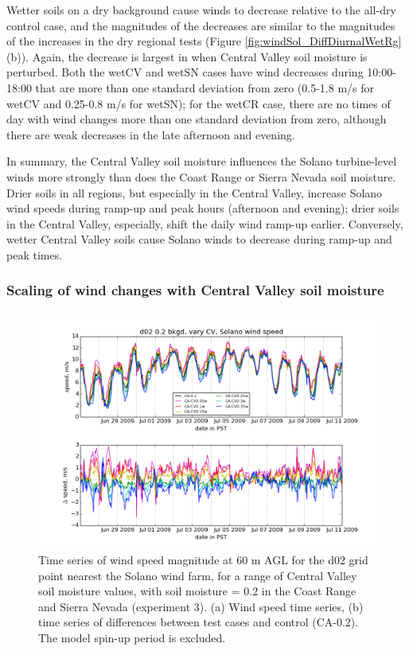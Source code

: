 Wetter soils on a dry background cause winds to decrease relative to the all-dry control case, and the magnitudes of the decreases are similar to the magnitudes of the increases in the dry regional tests (Figure \ref{fig:windSol_DiffDiurnalWetRg}(b)).  Again, the decrease is largest in when Central Valley soil moisture is perturbed.  Both the wetCV and wetSN cases have wind decreases during 10:00-18:00 that are more than one standard deviation from zero (0.5-1.8 m/s for wetCV and 0.25-0.8 m/s for wetSN); for the wetCR case, there are no times of day with wind changes more than one standard deviation from zero, although there are weak decreases in the late afternoon and evening.

In summary, the Central Valley soil moisture influences the Solano turbine-level winds more strongly than does the Coast Range or Sierra Nevada soil moisture.  Drier soils in all regions, but especially in the Central Valley, increase Solano wind speeds during ramp-up and peak hours (afternoon and evening); drier soils in the Central Valley, especially, shift the daily wind ramp-up earlier.  Conversely, wetter Central Valley soils cause Solano winds to decrease during ramp-up and peak times.

\subsubsection{Scaling of wind changes with Central Valley soil moisture}

\begin{figure}[here]
\includegraphics[width=1\textwidth]{ch3-wind/img/solano_wind_CV0pt2_d02_level0.png}
\caption{Time series of wind speed magnitude at 60 m AGL for the d02 grid point nearest the Solano wind farm, for a range of Central Valley soil moisture values, with soil moisture = 0.2 in the Coast Range and Sierra Nevada (experiment 3).  (a) Wind speed time series, (b) time series of differences between test cases and control (CA-0.2).  The model spin-up period is excluded.}
\label{fig:windSol_TseriesWindCV}
\end{figure}

